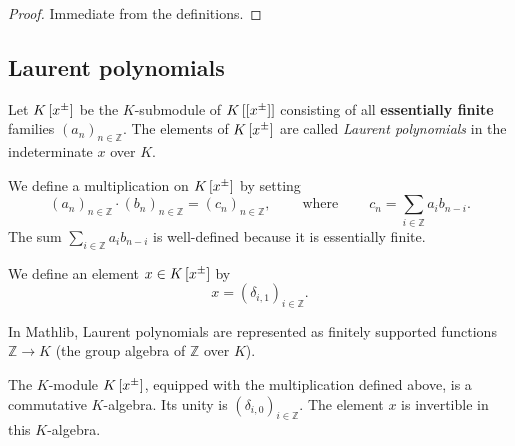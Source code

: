 \begin{proof}
\leanok
Immediate from the definitions.
\end{proof}

\subsection{Laurent polynomials}

\begin{definition}
\label{def.fps.laure.laupol}
\leantarget
\leanok
Let $K\left[  x^{\pm}\right]  $ be the
$K$-submodule of $K\left[  \left[  x^{\pm}\right]  \right]  $ consisting of
all \textbf{essentially finite} families $\left(  a_{n}\right)  _{n\in
\mathbb{Z}}$. The elements of $K\left[  x^{\pm}\right]  $ are called \emph{Laurent
polynomials} in the indeterminate $x$ over $K$.

We define a multiplication on $K\left[  x^{\pm}\right]  $ by setting%
\[
\left(  a_{n}\right)  _{n\in\mathbb{Z}}\cdot\left(  b_{n}\right)
_{n\in\mathbb{Z}}=\left(  c_{n}\right)  _{n\in\mathbb{Z}}%
,\ \ \ \ \ \ \ \ \ \ \text{where}\ \ \ \ \ \ \ \ \ \ c_{n}=\sum_{i\in
\mathbb{Z}}a_{i}b_{n-i}.
\]
The sum $\sum_{i\in\mathbb{Z}}a_{i}b_{n-i}$ is well-defined
because it is essentially finite.

We define an element $x\in K\left[  x^{\pm}\right]  $ by%
\[
x=\left(  \delta_{i,1}\right)  _{i\in\mathbb{Z}}.
\]

In Mathlib, Laurent polynomials are represented as
finitely supported functions $\mathbb{Z} \to K$ (the group algebra
of $\mathbb{Z}$ over $K$).
\end{definition}

\begin{theorem}
\label{thm.fps.laure.laupol-ring}
\leantarget
\leanok
The $K$-module $K\left[  x^{\pm}\right]  $,
equipped with the multiplication defined above, is a commutative
$K$-algebra. Its unity is $\left(  \delta_{i,0}\right)  _{i\in\mathbb{Z}}$.
The element $x$ is invertible in this $K$-algebra.
\end{theorem}

